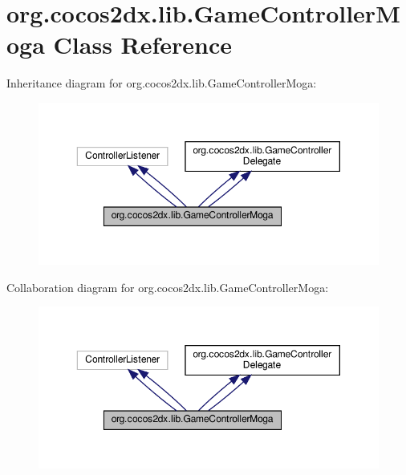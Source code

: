 \hypertarget{classorg_1_1cocos2dx_1_1lib_1_1GameControllerMoga}{}\section{org.\+cocos2dx.\+lib.\+Game\+Controller\+Moga Class Reference}
\label{classorg_1_1cocos2dx_1_1lib_1_1GameControllerMoga}


Inheritance diagram for org.\+cocos2dx.\+lib.\+Game\+Controller\+Moga\+:
\nopagebreak
\begin{figure}[H]
\begin{center}
\leavevmode
\includegraphics[width=350pt]{classorg_1_1cocos2dx_1_1lib_1_1GameControllerMoga__inherit__graph}
\end{center}
\end{figure}


Collaboration diagram for org.\+cocos2dx.\+lib.\+Game\+Controller\+Moga\+:
\nopagebreak
\begin{figure}[H]
\begin{center}
\leavevmode
\includegraphics[width=350pt]{classorg_1_1cocos2dx_1_1lib_1_1GameControllerMoga__coll__graph}
\end{center}
\end{figure}
